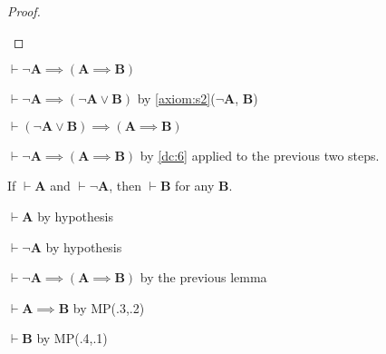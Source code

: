 \documentclass{amsart}%
\newcommand\metavariable[1]{\boldsymbol{#1}}
\begin{document}
\begin{proof}
\begin{enumerate}
\end{enumerate}
\end{proof}

\begin{lemma}\label{lemma:prop:explode-helper}
$\vdash\neg\metavariable{A}\implies(\metavariable{A}\implies\metavariable{B})$
\end{lemma}

\begin{pf}
\item $\vdash\neg\metavariable{A}\implies(\neg\metavariable{A}\lor\metavariable{B})$
  by \ref{axiom:s2}($\neg\metavariable{A}$, $\metavariable{B}$)
\item $\vdash(\neg\metavariable{A}\lor\metavariable{B})\implies(\metavariable{A}\implies\metavariable{B})$
\item $\vdash\neg\metavariable{A}\implies(\metavariable{A}\implies\metavariable{B})$
  by \ref{dc:6} applied to the previous two steps.
\end{pf}

\begin{lemma}\label{lemma:prop:explosion}
If $\vdash\metavariable{A}$ and $\vdash\neg\metavariable{A}$, then
$\vdash\metavariable{B}$ for any $\metavariable{B}$.
\end{lemma}

\begin{pf}
\item $\vdash\metavariable{A}$ by hypothesis
\item $\vdash\neg\metavariable{A}$ by hypothesis
\item $\vdash\neg\metavariable{A}\implies(\metavariable{A}\implies\metavariable{B})$
  by the previous lemma
\item $\vdash\metavariable{A}\implies\metavariable{B}$ by MP(.3,.2)
\item $\vdash\metavariable{B}$ by MP(.4,.1)
\end{pf}
\end{document}
